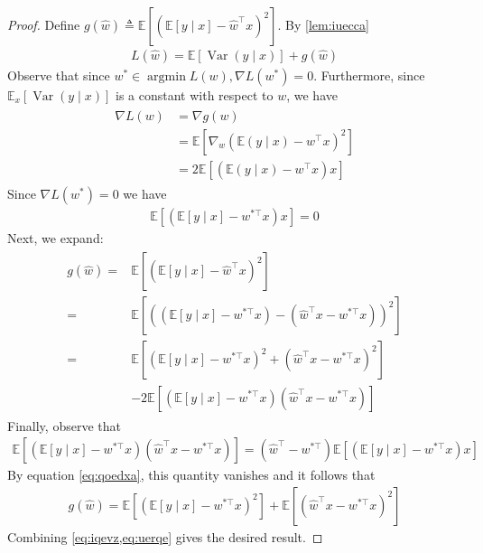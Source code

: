 \documentclass{article}
\begin{document}
\begin{proof}
 Define $g(\hat{w}) \triangleq \mathbb{E}\left[\left(\mathbb{E}[y \mid x]-\hat{w}^{\top} x\right)^{2}\right]$. By \cref{lem:iuecca}
\begin{align}
L(\hat{w})=\mathbb{E}[\operatorname{Var}(y \mid x)]+g(\hat{w})\label{eq:iqevz}
\end{align}
Observe that since $w^{*} \in \operatorname{argmin} L(w), \nabla L\left(w^{*}\right)=0 .$ Furthermore, since $\mathbb{E}_{x}[\operatorname{Var}(y \mid x)]$ is a constant with respect to $w$, we have
\begin{align*}
\begin{aligned}
\nabla L(w) &=\nabla g(w) \\
&=\mathbb{E}\left[\nabla_{w}\left(\mathbb{E}(y \mid x)-w^{\top} x\right)^{2}\right] \\
&=2 \mathbb{E}\left[\left(\mathbb{E}(y \mid x)-w^{\top} x\right) x\right]
\end{aligned}
\end{align*}
Since $\nabla L\left(w^{*}\right)=0$ we have
\begin{align}
\mathbb{E}\left[\left(\mathbb{E}[y \mid x]-w^{* \top} x\right) x\right]=0\label{eq:qoedxa}
\end{align}
Next, we expand:
\begin{align*}
\begin{aligned}
g(\hat{w})=& \mathbb{E}\left[\left(\mathbb{E}[y \mid x]-\hat{w}^{\top} x\right)^{2}\right] \\
=& \mathbb{E}\left[\left(\left(\mathbb{E}[y \mid x]-w^{* \top} x\right)-\left(\hat{w}^{\top} x-w^{* \top} x\right)\right)^{2}\right] \\
=& \mathbb{E}\left[\left(\mathbb{E}[y \mid x]-w^{* \top} x\right)^{2}+\left(\hat{w}^{\top} x-w^{* \top} x\right)^{2}\right] \\
&-2 \mathbb{E}\left[\left(\mathbb{E}[y \mid x]-w^{* \top} x\right)\left(\hat{w}^{\top} x-w^{* \top} x\right)\right]
\end{aligned}
\end{align*}
Finally, observe that
\begin{align*}
\mathbb{E}\left[\left(\mathbb{E}[y \mid x]-w^{* \top} x\right)\left(\hat{w}^{\top} x-w^{* \top} x\right)\right]=\left(\hat{w}^{\top}-w^{* \top}\right) \mathbb{E}\left[\left(\mathbb{E}[y \mid x]-w^{* \top} x\right) x\right]
\end{align*}
By equation \cref{eq:qoedxa}, this quantity vanishes and it follows that
\begin{align}
g(\hat{w})=\mathbb{E}\left[\left(\mathbb{E}[y \mid x]-w^{* \top} x\right)^{2}\right]+\mathbb{E}\left[\left(\hat{w}^{\top} x-w^{* \top} x\right)^{2}\right]\label{eq:uerqe}
\end{align}
Combining \cref{eq:iqevz,eq:uerqe} gives the desired result.
\end{proof} 
\end{document}
